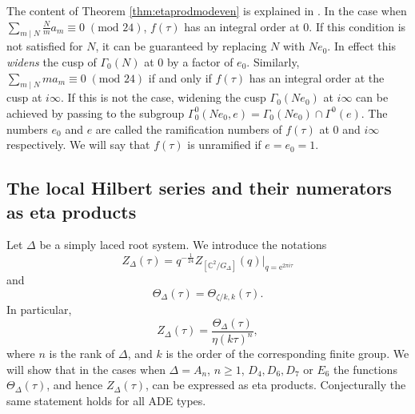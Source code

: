 \documentclass[11pt,a4paper]{amsart}
\theoremstyle{definition}
\newcommand{\SC}{\mathbb{C}}                    %
\begin{document}
The content of Theorem \ref{thm:etaprodmodeven} is explained in \cite[Section 1]{gordon1989multiplicative}. 
In the case when $\sum_{m \mid N} \frac{N}{m}a_m \equiv 0 \;(\textrm{mod }24)$, $f(\tau)$ has an integral order at 0. If this condition is not satisfied for $N$, it can be guaranteed by replacing $N$ with $Ne_0$. In effect this \emph{widens} the cusp of $\Gamma_0(N)$ at 0 by a factor of $e_0$. Similarly,  $\sum_{m \mid N} ma_m \equiv 0 \;(\textrm{mod }24)$ if and only if $f(\tau)$ has an integral order at the cusp at $i\infty$. If this is not the case, widening the cusp $\Gamma_0(Ne_0)$ at $i\infty$ can be achieved by passing to the subgroup $\Gamma_0^0(Ne_0,e)=\Gamma_0(Ne_0) \cap \Gamma^0(e)$. The numbers $e_0$ and $e$ are called the ramification numbers of $f(\tau)$ at $0$ and $i\infty$ respectively. We will say that $f(\tau)$ is unramified if $e=e_0=1$.




\subsection{The local Hilbert series and their numerators as eta products}

Let $\Delta$ be a simply laced root system. We introduce the notations
\[ Z_{\Delta}(\tau)=q^{-\frac{1}{24}}Z_{[\SC^2/G_\Delta]}(q)\Big|_{q=\mathrm{e}^{2 \pi i \tau}}  \]
and 
\[  \Theta_{\Delta}(\tau)=\Theta_{ \zeta/k ,k}(\tau ). \]
In particular,
\[ Z_{\Delta}(\tau)=\frac{\Theta_{\Delta}(\tau)}{\eta(k\tau)^n}, \]
where $n$ is the rank of $\Delta$, and $k$ is the order of the corresponding finite group.
We will show that in the cases when $\Delta=A_n$, $n\geq 1$, $D_4, D_6, D_7$ or $E_6$ the functions $\Theta_{\Delta}(\tau)$, and hence $Z_{\Delta}(\tau)$, can be expressed as eta products. Conjecturally the same statement holds for all ADE types.
\end{document}
